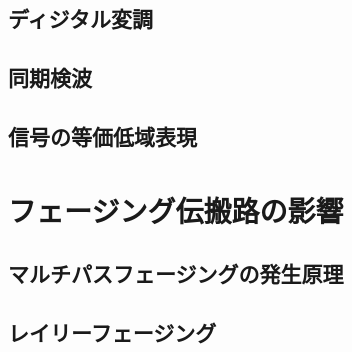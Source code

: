 \subsection{ディジタル変調}
\subsection{同期検波}
\subsection{信号の等価低域表現}

\section{フェージング伝搬路の影響}
\subsection{マルチパスフェージングの発生原理}
\subsection{レイリーフェージング}

